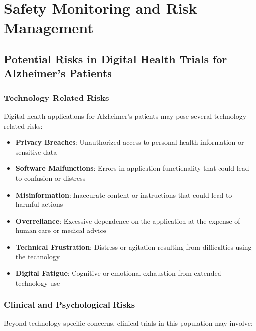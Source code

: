 \chapter{Safety Monitoring and Risk Management}

\section{Potential Risks in Digital Health Trials for Alzheimer's Patients}
\subsection{Technology-Related Risks}
Digital health applications for Alzheimer's patients may pose several technology-related risks:

\begin{itemize}
    \item \textbf{Privacy Breaches}: Unauthorized access to personal health information or sensitive data
    
    \item \textbf{Software Malfunctions}: Errors in application functionality that could lead to confusion or distress
    
    \item \textbf{Misinformation}: Inaccurate content or instructions that could lead to harmful actions
    
    \item \textbf{Overreliance}: Excessive dependence on the application at the expense of human care or medical advice
    
    \item \textbf{Technical Frustration}: Distress or agitation resulting from difficulties using the technology
    
    \item \textbf{Digital Fatigue}: Cognitive or emotional exhaustion from extended technology use
\end{itemize}

\subsection{Clinical and Psychological Risks}
Beyond technology-specific concerns, clinical trials in this population may involve:

